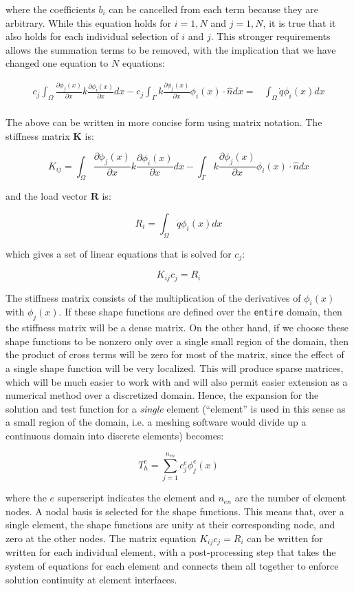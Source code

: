 \documentclass[10pt]{article}
\newcommand{\beq}{\begin{equation}}
\newcommand{\eeq}{\end{equation}}
\newcommand{\beqa}{\begin{equation}\begin{aligned}}
\newcommand{\eeqa}{\end{aligned}\end{equation}}
\begin{document}
where the coefficients \(b_i\) can be cancelled from each term because they are arbitrary. While this equation holds for \(i=1, N\) and \(j=1, N\), it is true that it also holds for each individual selection of \(i\) and \(j\). This stronger requirements allows the summation terms to be removed, with the implication that we have changed one equation to \(N\) equations:

\beqa
c_j\int_{\Omega}\frac{\partial \phi_j(x)}{\partial x}k\frac{\partial\phi_i(x)}{\partial x}dx-c_j\int_{\Gamma}k\frac{\partial \phi_j(x)}{\partial x}\phi_i(x)\cdot\hat{n}dx=&\int_{\Omega}\dot{q}\phi_i(x)dx\\
\eeqa

The above can be written in more concise form using matrix notation. The stiffness matrix \textbf{K} is:

\beq
\label{eq:k}
K_{ij}=\int_{\Omega}\frac{\partial \phi_j(x)}{\partial x}k\frac{\partial\phi_i(x)}{\partial x}dx-\int_{\Gamma}k\frac{\partial \phi_j(x)}{\partial x}\phi_i(x)\cdot\hat{n}dx
\eeq

and the load vector \(\textbf{R}\) is:

\beq
R_{i}=\int_{\Omega}\dot{q}\phi_i(x)dx
\eeq

which gives a set of linear equations that is solved for \(c_j\):

\beq
K_{ij}c_j=R_i
\eeq

The stiffness matrix consists of the multiplication of the derivatives of \(\phi_i(x)\) with \(\phi_j(x)\). If these shape functions are defined over the {\tt entire} domain, then the stiffness matrix will be a dense matrix. On the other hand, if we choose these shape functions to be nonzero only over a single small region of the domain, then the product of cross terms will be zero for most of the matrix, since the effect of a single shape function will be very localized. This will produce sparse matrices, which will be much easier to work with and will also permit easier extension as a numerical method over a discretized domain. Hence, the expansion for the solution and test function for a {\it single} element (``element'' is used in this sense as a small region of the domain, i.e. a meshing software would divide up a continuous domain into discrete elements) becomes:

\beq
T_h^e=\sum_{j=1}^{n_{en}}c_j^e\phi_j^e(x)
\eeq

where the \(e\) superscript indicates the element and \(n_{en}\) are the number of element nodes. A nodal basis is selected for the shape functions. This means that, over a single element, the shape functions are unity at their corresponding node, and zero at the other nodes. The matrix equation \(K_{ij}c_j=R_i\) can be written for written for each individual element, with a post-processing step that takes the system of equations for each element and connects them all together to enforce solution continuity at element interfaces. 
\end{document}

